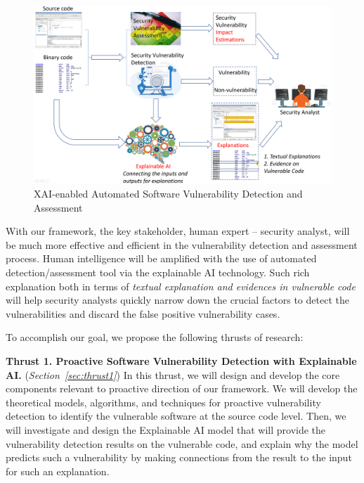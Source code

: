 \begin{figure}[t]
	\centering
	\includegraphics[width=5in]{xai-vda}
        \vspace{-12pt}
	\caption{XAI-enabled Automated Software Vulnerability Detection and Assessment}
	\label{fig:overview}
\end{figure}

With our framework, the key stakeholder, human expert -- security
analyst, will be much more effective and efficient in the
vulnerability detection and assessment process. Human intelligence
will be amplified with the use of automated detection/assessment tool
via the explainable AI technology. Such rich explanation both in terms
of {\em textual explanation and evidences in vulnerable code} will help security
analysts quickly narrow down the crucial factors to detect the
vulnerabilities and discard the false positive vulnerability cases.

To accomplish our goal, we propose the following thrusts of research:


\vspace{3pt}
\noindent \textbf{Thrust 1. Proactive Software Vulnerability Detection
  with Explainable AI.} ({\em Section~\ref{sec:thrust1}}) In this
thrust, we will design and develop the core components relevant to
proactive direction of our framework. We will develop the
theoretical models, algorithms, and techniques for proactive
vulnerability detection to identify the vulnerable software at the
source code level. Then, we will investigate and design the
Explainable AI model that will provide the vulnerability detection
results on the vulnerable code, and explain why the model
predicts such a vulnerability by making connections from the result to
the input for such an explanation.

